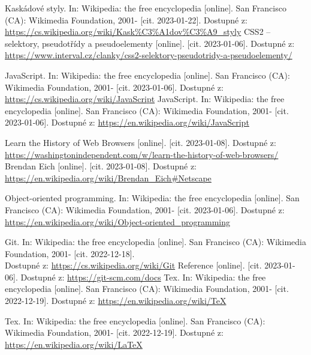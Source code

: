 \documentclass[main.tex]{subfiles}
\begin{document}
\begin{thebibliography}{99}
 Kaskádové styly. In: Wikipedia: the free encyclopedia [online]. San Francisco (CA): Wikimedia Foundation, 2001- [cit. 2023-01-22]. Dostupné z: \url{https://cs.wikipedia.org/wiki/Kask\%C3\%A1dov\%C3\%A9\_styly}
 CSS2 – selektory, pseudotřídy a pseudoelementy [online]. [cit. 2023-01-06]. Dostupné z: \url{https://www.interval.cz/clanky/css2-selektory-pseudotridy-a-pseudoelementy/}

 JavaScript. In: Wikipedia: the free encyclopedia [online]. San Francisco (CA): Wikimedia Foundation, 2001- [cit. 2023-01-06]. Dostupné z: \url{https://cs.wikipedia.org/wiki/JavaScript}
 JavaScript. In: Wikipedia: the free encyclopedia [online]. San Francisco (CA): Wikimedia Foundation, 2001- [cit. 2023-01-06]. Dostupné z: \url{https://en.wikipedia.org/wiki/JavaScript}

 Learn the History of Web Browsers [online]. [cit. 2023-01-08]. Dostupné z: \url{https://washingtonindependent.com/w/learn-the-history-of-web-browsers/}
 Brendan Eich [online]. [cit. 2023-01-08]. Dostupné z: \url{https://en.wikipedia.org/wiki/Brendan\_Eich#Netscape}

Object-oriented programming. In: Wikipedia: the free encyclopedia [online]. San Francisco (CA): Wikimedia Foundation, 2001- [cit. 2023-01-06]. Dostupné z: \url{https://en.wikipedia.org/wiki/Object-oriented\_programming}

 Git. In: Wikipedia: the free encyclopedia [online]. San Francisco (CA): Wikimedia Foundation, 2001- [cit. 2022-12-18].\\ Dostupné z: \url{https://cs.wikipedia.org/wiki/Git}
 Reference [online]. [cit. 2023-01-06]. Dostupné z: \url{https://git-scm.com/docs}
 Tex. In: Wikipedia: the free encyclopedia [online]. San Francisco (CA): Wikimedia Foundation, 2001- [cit. 2022-12-19]. Dostupné z: \url{https://en.wikipedia.org/wiki/TeX}

 Tex. In: Wikipedia: the free encyclopedia [online]. San Francisco (CA): Wikimedia Foundation, 2001- [cit. 2022-12-19]. Dostupné z: \url{https://en.wikipedia.org/wiki/LaTeX}


\end{thebibliography}
\end{document}
